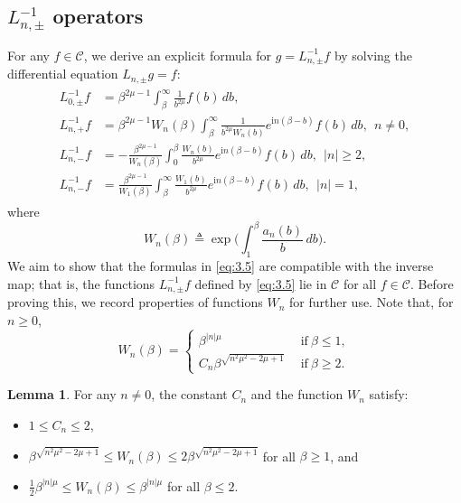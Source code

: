 \documentclass[11pt]{article}
\theoremstyle{definition}
\newtheorem{lemma}[theorem]{Lemma}
\theoremstyle{remark}
\numberwithin{equation}{section}
\newcommand{\mcal}{\mathcal}
\newcommand{\tsup}{\textsuperscript}
\newcommand{\tsub}{\textsubscript}
\begin{document}
\subsection{\texorpdfstring{$L_{n,\pm}^{-1}$}{L\tsub{n,pm}\tsup{-1}} operators}
For any $f\in \mcal{C}$, we derive an explicit formula for $g = L_{n,\pm}^{-1} f$ by solving the differential equation $L_{n,\pm} g = f$:
\begin{align} \label{eq:3.5} \begin{split}
L_{0,\pm}^{-1} f &= \beta^{2\mu - 1} \int_\beta^\infty \frac{1}{b^{2\mu}} f(b) \,db, \\
L_{n,+}^{-1} f &= \beta^{2\mu - 1} W_n(\beta) \int_\beta^\infty \frac{1}{b^{2\mu} W_n(b)} e^{\textrm{i}n(\beta - b)} f(b) \,db, ~~n\neq 0, \\
L_{n,-}^{-1} f &= -\frac{\beta^{2\mu - 1}}{W_n(\beta)} \int_0^\beta \frac{W_n(b)}{b^{2\mu}} e^{\textrm{i}n(\beta - b)} f(b) \,db, ~~|n|\geq 2, \\
L_{n, -}^{-1} f &= \frac{\beta^{2\mu - 1}}{W_1(\beta)} \int_\beta^\infty \frac{W_1(b)}{b^{2\mu}} e^{\textrm{i}n(\beta - b)} f(b) \,db,~~ |n| = 1,
\end{split} \end{align}
where
\[W_n(\beta) \triangleq \exp\bigg( \int_1^\beta \frac{a_n(b)}{b} \,db \bigg).\]
We aim to show that the formulas in \eqref{eq:3.5} are compatible with the inverse map; that is, the functions $L_{n,\pm}^{-1} f$ defined by \eqref{eq:3.5} lie in $\mcal{C}$ for all $f\in\mcal{C}$. Before proving this, we record properties of functions $W_n$ for further use. Note that, for $n\geq 0$,
\[W_n(\beta) = \begin{cases} \beta^{|n|\mu} & ~~\text{if}~ \beta \leq 1, \\ C_n \beta^{\sqrt{n^2 \mu^2 - 2\mu + 1}} & ~~\text{if}~ \beta \geq 2.\end{cases}\]
\begin{lemma} \label{lem:3.5}
For any $n\neq 0$, the constant $C_n$ and the function $W_n$ satisfy:
\vspace{-.5em}\begin{itemize}
	\item $1\leq C_n \leq 2$,
	\item $\beta^{\sqrt{n^2 \mu^2 - 2\mu + 1}} \leq W_n(\beta) \leq 2\beta^{\sqrt{n^2 \mu^2 - 2\mu + 1}}$ for all $\beta \geq 1$, and
	\item $\frac{1}{2} \beta^{|n|\mu} \leq W_n(\beta) \leq \beta^{|n|\mu}$ for all $\beta \leq 2$.
\end{itemize}
\end{lemma}
\end{document}
